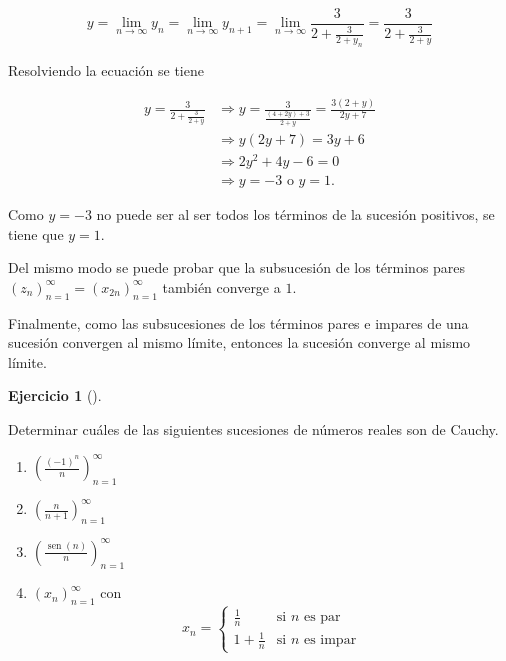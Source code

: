 \documentclass[
  spanish,
  a4paper,
]{scrreport}
\theoremstyle{definition}
\newtheorem{exercise}{Ejercicio}[chapter]
\theoremstyle{remark}
\begin{document}
\begin{tcolorbox}
\begin{enumerate}
  \[
   y = \lim_{n\to\infty}y_n = \lim_{n\to\infty}y_{n+1} = \lim_{n\to\infty}\frac{3}{2+\frac{3}{2+y_n}} = \frac{3}{2+\frac{3}{2+y}}
   \]

  Resolviendo la ecuación se tiene

  \begin{align*}
   y=\frac{3}{2+\frac{3}{2+y}} &\Rightarrow y= \frac{3}{\frac{(4+2y)+3}{2+y}} = \frac{3(2+y)}{2y+7} \\ 
   &\Rightarrow y(2y+7) = 3y+6 \\ 
   & \Rightarrow 2y^2+4y-6 = 0\\ 
   &\Rightarrow y=-3 \mbox{ o } y=1.
   \end{align*}

  Como \(y=-3\) no puede ser al ser todos los términos de la sucesión
  positivos, se tiene que \(y=1\).

  Del mismo modo se puede probar que la subsucesión de los términos
  pares \((z_n)_{n=1}^\infty = (x_{2n})_{n=1}^\infty\) también converge
  a \(1\).

  Finalmente, como las subsucesiones de los términos pares e impares de
  una sucesión convergen al mismo límite, entonces la sucesión converge
  al mismo límite.
\end{enumerate}

\end{tcolorbox}

\begin{exercise}[]\protect\hypertarget{exr-sucesiones-cauchy}{}\label{exr-sucesiones-cauchy}

Determinar cuáles de las siguientes sucesiones de números reales son de
Cauchy.

\begin{enumerate}
\def\labelenumi{\alph{enumi}.}
\item
  \(\left(\frac{(-1)^n}{n}\right)_{n=1}^\infty\)
\item
  \(\left(\frac{n}{n+1}\right)_{n=1}^\infty\)
\item
  \(\left(\frac{\operatorname{sen}(n)}{n}\right)_{n=1}^\infty\)
\item
  \((x_n)_{n=1}^\infty\) con \[
  x_n=
  \begin{cases}
  \frac{1}{n} & \mbox{si $n$ es par}\\
  1+\frac{1}{n} & \mbox{si $n$ es impar}
  \end{cases}
  \]
\end{enumerate}

\end{exercise}
\end{document}

